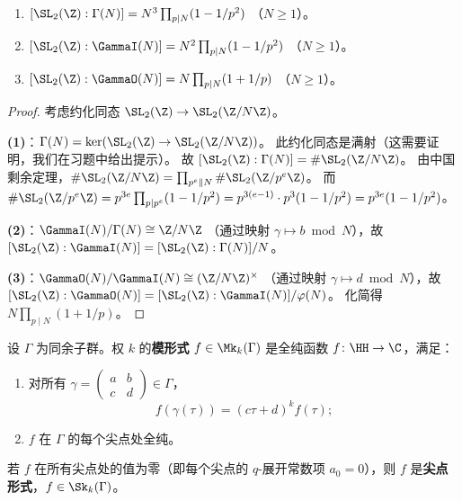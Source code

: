 \begin{proposition}[指标公式]
\label{prop:index-formulas}
\leavevmode
\begin{enumerate}
  \item $[\SL_2(\Z) : \Gamma(N)] = N^3 \prod_{p \mid N}(1 - 1/p^2)$
    （$N \geq 1$）。
  \item $[\SL_2(\Z) : \GammaI(N)] = N^2 \prod_{p \mid N}(1 - 1/p^2)$
    （$N \geq 1$）。
  \item $[\SL_2(\Z) : \GammaO(N)] = N \prod_{p \mid N}(1 + 1/p)$
    （$N \geq 1$）。
\end{enumerate}
\end{proposition}

\begin{proof}
考虑约化同态 $\SL_2(\Z) \to \SL_2(\Z/N\Z)$。

\textbf{(1)}：$\Gamma(N) = \ker(\SL_2(\Z) \to \SL_2(\Z/N\Z))$。
此约化同态是满射（这需要证明，我们在习题中给出提示）。
故 $[\SL_2(\Z) : \Gamma(N)] = \#\SL_2(\Z/N\Z)$。
由中国剩余定理，$\#\SL_2(\Z/N\Z) = \prod_{p^e \| N} \#\SL_2(\Z/p^e\Z)$。
而 $\#\SL_2(\Z/p^e\Z) = p^{3e} \prod_{p \mid p^e}(1 - 1/p^2)
= p^{3(e-1)} \cdot p^3(1 - 1/p^2) = p^{3e}(1 - 1/p^2)$。

\textbf{(2)}：$\GammaI(N)/\Gamma(N) \cong \Z/N\Z$
（通过映射 $\gamma \mapsto b \bmod N$），故
$[\SL_2(\Z) : \GammaI(N)] = [\SL_2(\Z) : \Gamma(N)]/N$。

\textbf{(3)}：$\GammaO(N)/\GammaI(N) \cong (\Z/N\Z)^\times$
（通过映射 $\gamma \mapsto d \bmod N$），故
$[\SL_2(\Z) : \GammaO(N)] = [\SL_2(\Z) : \GammaI(N)]/\varphi(N)$。
化简得 $N \prod_{p \mid N}(1 + 1/p)$。
\end{proof}

\begin{definition}[同余子群上的模形式]
\label{def:modular-forms-congruence}
设 $\Gamma$ 为同余子群。权 $k$ 的\textbf{模形式} $f \in \Mk_k(\Gamma)$
是全纯函数 $f\colon \HH \to \C$，满足：
\begin{enumerate}
  \item 对所有 $\gamma = \begin{pmatrix} a & b \\ c & d \end{pmatrix}
    \in \Gamma$，
    \[
      f(\gamma(\tau)) = (c\tau + d)^k f(\tau);
    \]
  \item $f$ 在 $\Gamma$ 的每个尖点处全纯。
\end{enumerate}
若 $f$ 在所有尖点处的值为零（即每个尖点的 $q$-展开常数项 $a_0 = 0$），则 $f$ 是\textbf{尖点形式}，$f \in \Sk_k(\Gamma)$。
\end{definition}


